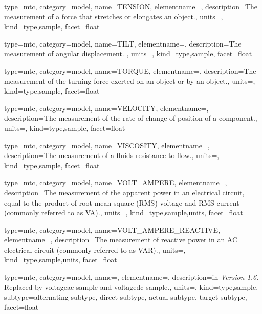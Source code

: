 {
  type=mtc,
  category=model,
  name={TENSION},
  elementname=,
  description={The measurement of a force that stretches or elongates an object.},
  units=,
  kind={type,sample},
  facet={\gls{float}}
}


{
  type=mtc,
  category=model,
  name={TILT},
  elementname=,
  description={The measurement of angular displacement. },
  units=,
  kind={type,sample},
  facet={\gls{float}}
}


{
  type=mtc,
  category=model,
  name={TORQUE},
  elementname=,
  description={The measurement of the turning force exerted on an object or by an object.},
  units=,
  kind={type,sample},
  facet={\gls{float}}
}


{
  type=mtc,
  category=model,
  name={VELOCITY},
  elementname=,
  description={The measurement of the rate of change of position of a \gls{component}.},
  units=,
  kind={type,sample},
  facet={\gls{float}}
}


{
  type=mtc,
  category=model,
  name={VISCOSITY},
  elementname=,
  description={The measurement of a fluids resistance to flow.},
  units=,
  kind={type,sample},
  facet={\gls{float}}
}


{
  type=mtc,
  category=model,
  name={VOLT\_AMPERE},
  elementname=,
  description={The measurement of the apparent power in an electrical circuit, equal to the product of root-mean-square (RMS) voltage and RMS current (commonly referred to as VA).},
  units=,
  kind={type,sample,units},
  facet={\gls{float}}
}


{
  type=mtc,
  category=model,
  name={VOLT\_AMPERE\_REACTIVE},
  elementname=,
  description={The measurement of reactive power in an AC electrical circuit (commonly referred to as VAR).},
  units=,
  kind={type,sample,units},
  facet={\gls{float}}
}


{
  type=mtc,
  category=model,
  name=,
  elementname=,
  description={\DEPRECATED in \textit{Version 1.6}. Replaced by \gls{voltageac sample} and \gls{voltagedc sample}.},
  units=,
  kind={type,sample},
  subtype={\gls{alternating subtype}, \gls{direct subtype}, \gls{actual subtype}, \gls{target subtype}},
  facet={\gls{float}}
}

